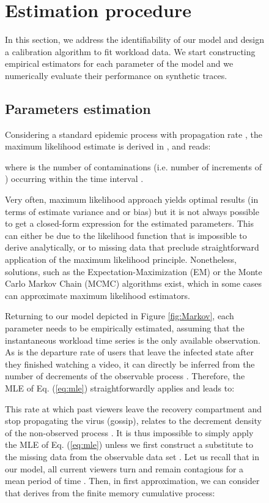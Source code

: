\documentclass[twoside]{article}
\newcommand{\roy}[2]{#2}
\begin{document}
\begin{figure}[h]
\section{Estimation procedure}
\label{sec:estimation}
In this section, we address the identifiability of our model and design a calibration algorithm to fit workload data.
We start constructing empirical estimators for each parameter of the model and we numerically evaluate their performance on synthetic traces. 


\subsection{Parameters estimation}
\label{sec:est_method}

Considering a standard epidemic process  with propagation rate , the maximum likelihood estimate  is derived in \cite{BarDynaPro2008}, \cite{AndStoEpi2000} and reads:

where  is the number of contaminations (i.e. number of increments of ) occurring within the time interval .

Very often, maximum likelihood approach yields optimal results (in terms of estimate variance and or bias) but it is not always possible to get a closed-form expression for the estimated parameters. This can either be due to the likelihood function that is impossible to derive analytically, or to missing data that preclude straightforward application of the maximum likelihood principle. Nonetheless, solutions, such as the Expectation-Maximization (EM) or the Monte Carlo Markov Chain (MCMC) algorithms exist, which in some cases can approximate maximum likelihood estimators. 

Returning to our model depicted in Figure \ref{fig:Markov}, each parameter needs to be empirically estimated, assuming that the instantaneous workload time series is the only available observation.\\

 As  is the departure rate of users that leave the infected state after they finished watching a video, it can directly be inferred from the number  of decrements of the observable process . Therefore,  the MLE  of \roy{equation}{Eq.} (\ref{eq:mle}) straightforwardly applies and leads to:

 
 This rate at which past viewers leave the recovery compartment and stop propagating the virus (gossip), relates to the decrement density of the non-observed process . It is thus impossible to simply apply the MLE of Eq. (\ref{eq:mle}) unless we first construct a substitute  to the missing data from the observable data set . Let us recall that in our model, all current viewers turn and remain contagious for a mean period of time . Then, in first approximation, we can consider that  derives from the finite memory cumulative process: 


\end{figure}
\end{document}
